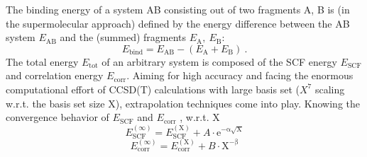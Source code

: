 \documentclass[a4paper,12pt, parskip=half]{scrartcl}
\begin{document}
The binding energy of a system AB consisting out of two fragments A, B is (in the supermolecular approach) defined by the energy difference between the AB system $ E_\mathrm{AB} $ and the (summed) fragments $ E_\mathrm{A},~E_\mathrm{B} $:
%
\begin{equation}
	E_\mathrm{bind} = E_\mathrm{AB} - ( E_\mathrm{A} + E_\mathrm{B} )~.
\end{equation}
%
The total energy $ E_\mathrm{tot} $ of an arbitrary system is composed of the SCF energy $ E_\mathrm{SCF} $ and correlation energy $ E_\mathrm{corr} $. Aiming for high accuracy and facing the enormous computational effort of CCSD(T) calculations with large basis set ($ X^7 $ scaling w.r.t. the basis set size X), extrapolation techniques come into play. Knowing the convergence behavior of $ E_\mathrm{SCF} $ and $ E_\mathrm{corr} $ , w.r.t. X
%
\begin{equation}
	E_\mathrm{SCF}^{(\infty)} = E_\mathrm{SCF}^{(\mathrm{X})} + A \cdot \mathrm{e^{-\alpha\sqrt{X}}}
	\label{eq:conv-escf}
\end{equation}
%
\begin{equation}
	E_\mathrm{corr}^{(\infty)} = E_\mathrm{corr}^{(\mathrm{X})}+ B \cdot \mathrm{X^{-\beta}}
	\label{eq:conv-ecorr}
\end{equation}
%
\end{document}
